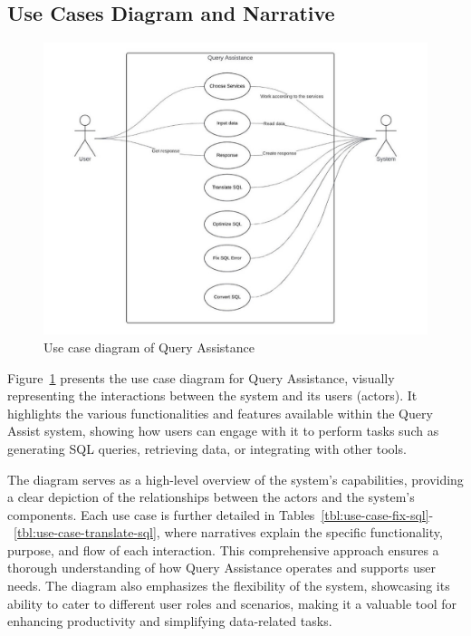     \subsection{Use Cases Diagram and Narrative}
    \begin{figure}[H]
        \centering
        \includegraphics[width=15cm]{chapters/3/figures/usecase_diagram.jpg}
        \caption[Use case diagram of Query Assistance]{Use case diagram of Query Assistance}
        \label{fig:usecase_diagram}
    \end{figure}
    Figure~\ref{fig:usecase_diagram} presents the use case diagram for Query Assistance, visually representing the interactions between the system and its users (actors). It highlights the various functionalities and features available within the Query Assist system, showing how users can engage with it to perform tasks such as generating SQL queries, retrieving data, or integrating with other tools.

    The diagram serves as a high-level overview of the system's capabilities, providing a clear depiction of the relationships between the actors and the system's components. Each use case is further detailed in Tables~\ref{tbl:use-case-fix-sql}-~\ref{tbl:use-case-translate-sql}, where narratives explain the specific functionality, purpose, and flow of each interaction. This comprehensive approach ensures a thorough understanding of how Query Assistance operates and supports user needs. The diagram also emphasizes the flexibility of the system, showcasing its ability to cater to different user roles and scenarios, making it a valuable tool for enhancing productivity and simplifying data-related tasks.

